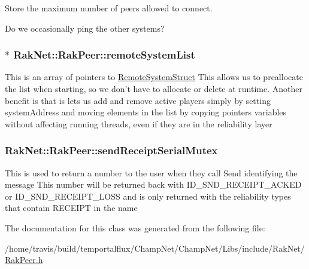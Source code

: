 Store the maximum number of peers allowed to connect. 

Do we occasionally ping the other systems? \hypertarget{class_rak_net_1_1_rak_peer_a433a287f35dd77985ae4ac579e6adf76}{
\subsubsection[{remote\-System\-List}]{$\ast$ Rak\-Net\-::\-Rak\-Peer\-::remote\-System\-List\hspace{0.3cm}{\ttfamily [protected]}}}\label{class_rak_net_1_1_rak_peer_a433a287f35dd77985ae4ac579e6adf76}
This is an array of pointers to \hyperlink{struct_rak_net_1_1_rak_peer_1_1_remote_system_struct}{Remote\-System\-Struct} This allows us to preallocate the list when starting, so we don't have to allocate or delete at runtime. Another benefit is that is lets us add and remove active players simply by setting system\-Address and moving elements in the list by copying pointers variables without affecting running threads, even if they are in the reliability layer \hypertarget{class_rak_net_1_1_rak_peer_aa4972e4a0c0573671148f33ca2c9ebd6}{
\subsubsection[{send\-Receipt\-Serial\-Mutex}]{ Rak\-Net\-::\-Rak\-Peer\-::send\-Receipt\-Serial\-Mutex\hspace{0.3cm}{\ttfamily [protected]}}}\label{class_rak_net_1_1_rak_peer_aa4972e4a0c0573671148f33ca2c9ebd6}
This is used to return a number to the user when they call Send identifying the message This number will be returned back with I\-D\-\_\-\-S\-N\-D\-\_\-\-R\-E\-C\-E\-I\-P\-T\-\_\-\-A\-C\-K\-E\-D or I\-D\-\_\-\-S\-N\-D\-\_\-\-R\-E\-C\-E\-I\-P\-T\-\_\-\-L\-O\-S\-S and is only returned with the reliability types that contain R\-E\-C\-E\-I\-P\-T in the name 

The documentation for this class was generated from the following file\-:\begin{DoxyCompactItemize}
\item 
/home/travis/build/temportalflux/\-Champ\-Net/\-Champ\-Net/\-Libs/include/\-Rak\-Net/\hyperlink{_rak_peer_8h}{Rak\-Peer.\-h}\end{DoxyCompactItemize}
